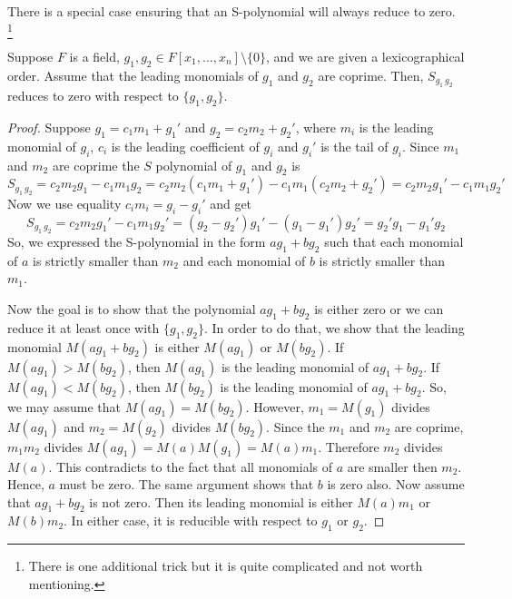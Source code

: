 There is a special case ensuring that an S-polynomial will always reduce to zero.%
\footnote{There is one additional trick but it is quite complicated and not worth mentioning.}

\begin{claim}
Suppose $F$ is a field, $g_1,g_2\in F[x_1,\ldots,x_n]\setminus\{0\}$, and we are given a lexicographical order.
Assume that the leading monomials of $g_1$ and $g_2$ are coprime.
Then, $S_{g_1\,g_2}$ reduces to zero with respect to $\{g_1,g_2\}$.
\end{claim}
\begin{proof}
Suppose $g_1 = c_1 m_1 + g_1'$ and $g_2 = c_2 m_2 + g_2'$, where $m_i$ is the leading monomial of $g_i$, $c_i$ is the leading coefficient of $g_i$ and $g_i'$ is the tail of $g_i$.
Since $m_1$ and $m_2$ are coprime the $S$ polynomial of $g_1$ and $g_2$ is
\[
S_{g_1\,g_2} = c_2m_2 g_1 - c_1 m_1 g_2 = c_2m_2 (c_1 m_1 + g_1') - c_1 m_1 (c_2 m_2 + g_2') = c_2m_2 g_1' - c_1 m_1 g_2'
\]
Now we use equality $c_i m_i = g_i - g_i'$ and get
\[
S_{g_1\,g_2} = c_2m_2 g_1' - c_1 m_1 g_2' = (g_2 - g_2')g_1' - (g_1 - g_1')g_2' = g_2' g_1 - g_1'g_2
\]
So, we expressed the S-polynomial in the form $a g_1 + b g_2$ such that each monomial of $a$ is strictly smaller than $m_2$ and each monomial of $b$ is strictly smaller than $m_1$.

Now the goal is to show that the polynomial $a g_1 + b g_2$ is either zero or we can reduce it at least once with $\{g_1, g_2\}$.
In order to do that, we show that the leading monomial $M(a g_1 + b g_2)$ is either $M(a g_1)$ or $M(bg_2)$.
If $M(a g_1)> M(bg_2)$, then $M(a g_1)$ is the leading monomial of $a g_1 + b g_2$.
If $M(a g_1) < M(bg_2)$, then $M(bg_2)$ is the leading monomial of $a g_1 + b g_2$.
So, we may assume that $M(a g_1) = M(bg_2)$.
However, $m_1 = M(g_1)$ divides $M(a g_1)$ and $m_2 = M(g_2)$ divides $M(b g_2)$.
Since the $m_1$ and $m_2$ are coprime, $m_1 m_2$ divides $M(a g_1) = M(a) M(g_1) = M(a) m_1$.
Therefore $m_2$ divides $M(a)$.
This contradicts to the fact that all monomials of $a$ are smaller then $m_2$.
Hence, $a$ must be zero.
The same argument shows that $b$ is zero also.
Now assume that $a g_1 + b g_2$ is not zero.
Then its leading monomial is either $M(a) m_1$ or $M(b) m_2$.
In either case, it is reducible with respect to $g_1$ or $g_2$.


\end{proof}
